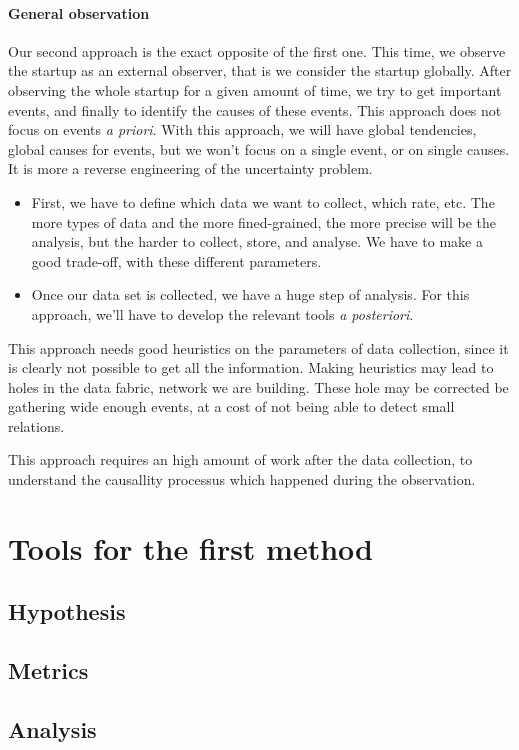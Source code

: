 \documentclass[twoside]{report}
\begin{document}
\paragraph{General observation}Our second approach is the exact opposite of the first one. This time, we observe the startup as an external observer, that is we consider the startup globally. After observing the whole startup for a given amount of time, we try to get important events, and finally to identify the causes of these events. This approach does not focus on events \emph{a priori}. With this approach, we will have global tendencies, global causes for events, but we won't focus on a single event, or on single causes. It is more a reverse engineering of the uncertainty problem. 
\begin{itemize}
	\item First, we have to define which data we want to collect, which rate, etc. The more types of data and the more fined-grained, the more precise will be the analysis, but the harder to collect, store, and analyse. We have to make a good trade-off, with these different parameters.
	\item Once our data set is collected, we have a huge step of analysis. For this approach, we'll have to develop the relevant tools \emph{a posteriori}. 
\end{itemize}
This approach needs good heuristics on the parameters of data collection, since it is clearly not possible to get all the information. Making heuristics may lead to holes in the data fabric, network we are building. These hole may be corrected be gathering wide enough events, at a cost of not being able to detect small relations.

This approach requires an high amount of work after the data collection, to understand the causallity processus which happened during the observation.
\section{Tools for the first method}
\subsection{Hypothesis}
\subsection{Metrics}
\subsection{Analysis}
\end{document}
